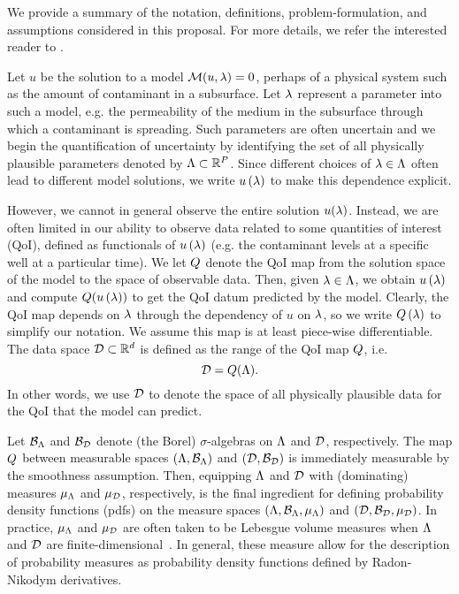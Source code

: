 We provide a summary of the notation, definitions, problem-formulation, and assumptions considered in this proposal. 
For more details,  we refer the interested reader to \cite{BES12, BE13, BET+14}. 

Let $u$ be the solution to a model $\mathcal{M}(u, \lambda) = 0$, perhaps of a physical system such as the amount of contaminant in a subsurface. 
Let $\lambda$ represent a parameter into such a model, e.g. the permeability of the medium in the subsurface through which a contaminant is spreading.
Such parameters are often uncertain and we begin the quantification of uncertainty by identifying the set of all physically plausible parameters denoted by ${\Lambda}\subset\mathbb{R}^P$.
Since different choices of $\lambda \in {\Lambda}$ often lead to different model solutions, we write $u\left ( \lambda \right )$ to make this dependence explicit.

However, we cannot in general observe the entire solution $u(\lambda)$.
Instead, we are often limited in our ability to observe data related to some quantities of interest (QoI), defined as functionals of $u\left ( \lambda \right )$ (e.g. the contaminant levels at a specific well at a particular time).
We let $Q$ denote the QoI map from the solution space of the model to the space of observable data. 
Then, given $\lambda \in {\Lambda}$, we obtain $u\left ( \lambda \right )$ and compute $Q(u\left ( \lambda \right ))$ to get the QoI datum predicted by the model.
Clearly, the QoI map depends on $\lambda$ through the dependency of $u$ on $\lambda$, so we write $Q\left ( \lambda \right )$ to simplify our notation.
We assume this map is at least piece-wise differentiable.	
The data space $\mathcal{D} \subset \mathbb{R}^d$ is defined as the range of the QoI map $Q$, i.e. 
\[
\mathcal{D} = Q({\Lambda}).
\]
In other words, we use $\mathcal{D}$ to denote the space of all physically plausible data for the QoI that the model can predict.


Let $\mathcal{B}_{{\Lambda}}$ and $\mathcal{B}_{\mathcal{D}}$ denote (the Borel) $\sigma$-algebras on ${\Lambda}$ and $\mathcal{D}$, respectively.
The map $Q$ between measurable spaces $({\Lambda}, \mathcal{B}_{{\Lambda}})$ and $(\mathcal{D}, \mathcal{B}_{\mathcal{D}})$ is immediately measurable by the smoothness assumption. 
Then, equipping ${\Lambda}$ and $\mathcal{D}$ with (dominating) measures $\mu_{{\Lambda}}$ and $\mu_{\mathcal{D}}$, respectively, is the final ingredient for defining probability density functions (pdfs) on the measure spaces $({\Lambda}, \mathcal{B}_{{\Lambda}}, \mu_{{\Lambda}})$ and $(\mathcal{D}, \mathcal{B}_{\mathcal{D}}, \mu_{\mathcal{D}})$.
In practice, $\mu_{{\Lambda}}$ and $\mu_{\mathcal{D}}$ are often taken to be Lebesgue volume measures when ${\Lambda}$ and $\mathcal{D}$ are finite-dimensional~\cite{BET+14, BJW18}.
In general, these measure allow for the description of probability measures as probability density functions defined by Radon-Nikodym derivatives.


